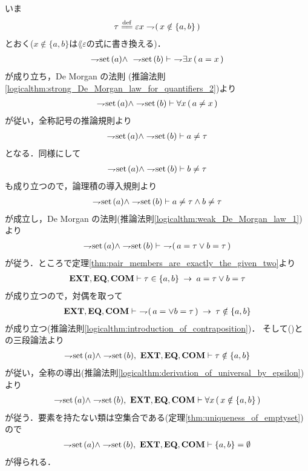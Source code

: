 	\begin{sketch}
		いま
		\begin{align}
			\tau \defeq \varepsilon x \negation (\, x \notin \{a,b\}\, )
		\end{align}
		とおく($x \notin \{a,b\}$は$\lang{\varepsilon}$の式に書き換える)．
		\begin{align}
			\rightharpoondown\hspace{-0.25em} \operatorname*{set}\hspace{0.15em}(a) \wedge\ \rightharpoondown\hspace{-0.25em} \operatorname*{set}\hspace{0.15em}(b)
			\vdash\ \rightharpoondown\hspace{-0.25em} \exists x\, (\, a = x\, )
		\end{align}
		が成り立ち，De Morgan の法則
		(推論法則\ref{logicalthm:strong_De_Morgan_law_for_quantifiers_2})より
		\begin{align}
			\rightharpoondown\hspace{-0.25em} \operatorname*{set}\hspace{0.15em}(a) \wedge \rightharpoondown\hspace{-0.25em} \operatorname*{set}\hspace{0.15em}(b)
			\vdash \forall x\, (\, a \neq x\, )
		\end{align}
		が従い，全称記号の推論規則より
		\begin{align}
			\rightharpoondown\hspace{-0.25em} \operatorname*{set}\hspace{0.15em}(a) \wedge \rightharpoondown\hspace{-0.25em} \operatorname*{set}\hspace{0.15em}(b) \vdash a \neq \tau
		\end{align}
		となる．同様にして
		\begin{align}
			\rightharpoondown\hspace{-0.25em} \operatorname*{set}\hspace{0.15em}(a) \wedge \rightharpoondown\hspace{-0.25em} \operatorname*{set}\hspace{0.15em}(b) \vdash b \neq \tau
		\end{align}
		も成り立つので，論理積の導入規則より
		\begin{align}
			\rightharpoondown\hspace{-0.25em} \operatorname*{set}\hspace{0.15em}(a) \wedge \rightharpoondown\hspace{-0.25em} \operatorname*{set}\hspace{0.15em}(b) \vdash
			a \neq \tau \wedge b \neq \tau
		\end{align}
		が成立し，De Morgan の法則(推論法則\ref{logicalthm:weak_De_Morgan_law_1})より
		\begin{align}
			\negation \set{a} \wedge \negation \set{b} \vdash\ 
			\negation (\, a = \tau \vee b = \tau\, )
			\label{fom:pair_of_proper_classes_is_emptyset_1}
		\end{align}
		が従う．ところで定理\ref{thm:pair_members_are_exactly_the_given_two}より
		\begin{align}
			\mbox{{\bf EXT}},\mbox{{\bf EQ}},\mbox{\bf COM} \vdash \tau \in \{a,b\} \hspace{0.25em}\rightarrow\hspace{0.25em} a = \tau \vee b = \tau
		\end{align}
		が成り立つので，対偶を取って
		\begin{align}
			\EXTAX,\EQAX,\COMAX \vdash\ 
			\negation (\, a = \vee b = \tau\, ) \rarrow \tau \notin \{a,b\}
		\end{align}
		が成り立つ(推論法則\ref{logicalthm:introduction_of_contraposition})．
		そして()との三段論法より
		\begin{align}
			\negation \set{a} \wedge \negation \set{b},\ \EXTAX,\EQAX,\COMAX \vdash
			\tau \notin \{a,b\}
		\end{align}
		が従い，全称の導出(推論法則\ref{logicalthm:derivation_of_universal_by_epsilon})より
		\begin{align}
			\negation \set{a} \wedge \negation \set{b},\ \EXTAX,\EQAX,\COMAX \vdash
			\forall x\, (\, x \notin \{a,b\}\, )
		\end{align}
		が従う．要素を持たない類は空集合である(定理\ref{thm:uniqueness_of_emptyset})ので
		\begin{align}
			\negation \set{a} \wedge \negation \set{b},\ \EXTAX,\EQAX,\COMAX \vdash
			\{a,b\} = \emptyset
		\end{align}
		が得られる．
		\QED
	\end{sketch}
	
